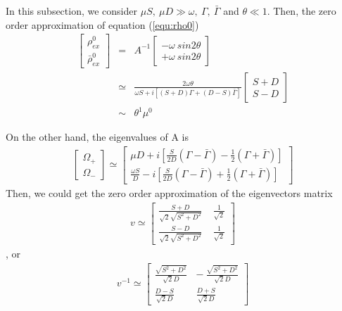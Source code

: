 \documentclass[aps,prd,twocolumn,amsmath,amssymb,groupedaddress]{revtex4-2}
\begin{document}
In this subsection, we consider $\mu S, ~\mu D \gg \omega, ~\Gamma, ~\bar{\Gamma} $ and $\theta \ll 1$. Then, the zero order approximation of equation (\ref{equ:rho0}) 
\begin{eqnarray}
	\begin{bmatrix} 
		\rho^0_{ex} \\ \bar{\rho}^0_{ex}
	\end{bmatrix} 
	&=& A^{-1} 
	\begin{bmatrix}
		-\omega ~sin2\theta \\ + \omega ~sin2\theta
	\end{bmatrix} \nonumber \\
	\label{equ:0_rho0}
	&\simeq&
	\frac{2\omega \theta}{\omega S + i\left[(S+D) \Gamma + (D-S) \bar{\Gamma}\right]}
	\begin{bmatrix}
		S+D \\ S-D
	\end{bmatrix} \\
	&\sim& \theta^1 \mu^0
\end{eqnarray}

On the other hand, the eigenvalues of A is
\begin{eqnarray}
	\begin{bmatrix}
		\Omega_+ \\ \Omega_-
	\end{bmatrix} \simeq
	\begin{bmatrix}
		\mu D + i \left[\frac{S}{2D}\left(\Gamma-\bar{\Gamma}\right)-\frac{1}{2}\left(\Gamma+\bar{\Gamma}\right)\right]\\
		\frac{\omega S}{D} - i \left[\frac{S}{2D}\left(\Gamma-\bar{\Gamma}\right)+\frac{1}{2}\left(\Gamma+\bar{\Gamma}\right)\right]
	\end{bmatrix}
\end{eqnarray}
Then, we could get the zero order approximation of the eigenvectors matrix 
\begin{eqnarray}
	\label{equ:0_eigenvectors}
	v \simeq
	\begin{bmatrix}
		\frac{S+D}{\sqrt{2}\sqrt{S^2+D^2}} ~~~~~ \frac{1}{\sqrt{2}}\\
		\frac{S-D}{\sqrt{2}\sqrt{S^2+D^2}} ~~~~~ \frac{1}{\sqrt{2}}
	\end{bmatrix}
\end{eqnarray}, or
\begin{eqnarray}
	\label{equ:0_antieigenvectors}
	v^{-1}\simeq
	\begin{bmatrix}
		\frac{\sqrt{S^2+D^2}}{\sqrt{2}D} ~~~ -\frac{\sqrt{S^2+D^2}}{\sqrt{2}D}\\
		\frac{D-S}{\sqrt{2}D} ~~~~~~~~~~ \frac{D+S}{\sqrt{2}D}
	\end{bmatrix}
\end{eqnarray}
\end{document}

